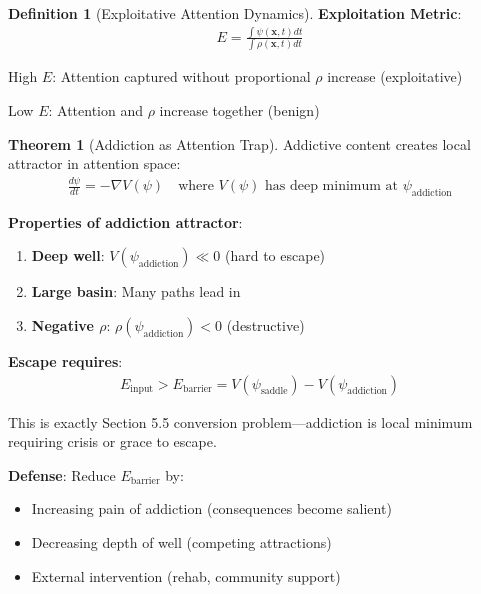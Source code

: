 \documentclass[11pt,a4paper]{article}
\theoremstyle{definition}
\newtheorem{definition}{Definition}[section]
\newtheorem{theorem}{Theorem}[section]
\theoremstyle{remark}
\begin{document}
\begin{enumerate}
\begin{definition}[Exploitative Attention Dynamics]
\textbf{Exploitation Metric}:
\begin{align}
E = \frac{\int \psi(\mathbf{x}, t) dt}{\int \rho(\mathbf{x}, t) dt}
\end{align}

High \(E\): Attention captured without proportional \(\rho\) increase (exploitative)

Low \(E\): Attention and \(\rho\) increase together (benign)
\end{definition}

\begin{theorem}[Addiction as Attention Trap]
Addictive content creates local attractor in attention space:
\begin{align}
\frac{d\psi}{dt} = -\nabla V(\psi) \quad \text{where } V(\psi) \text{ has deep minimum at } \psi_{\text{addiction}}
\end{align}

\textbf{Properties of addiction attractor}:
\begin{enumerate}
    \item \textbf{Deep well}: \(V(\psi_{\text{addiction}}) \ll 0\) (hard to escape)
    \item \textbf{Large basin}: Many paths lead in
    \item \textbf{Negative \(\rho\)}: \(\rho(\psi_{\text{addiction}}) < 0\) (destructive)
\end{enumerate}

\textbf{Escape requires}:
\begin{align}
E_{\text{input}} > E_{\text{barrier}} = V(\psi_{\text{saddle}}) - V(\psi_{\text{addiction}})
\end{align}

This is exactly Section 5.5 conversion problem—addiction is local minimum requiring crisis or grace to escape.

\textbf{Defense}: Reduce \(E_{\text{barrier}}\) by:
\begin{itemize}
    \item Increasing pain of addiction (consequences become salient)
    \item Decreasing depth of well (competing attractions)
    \item External intervention (rehab, community support)
\end{itemize}
\end{theorem}

\begin{figure}[H]
\centering
{}
\end{figure}
\end{enumerate}
\end{document}
